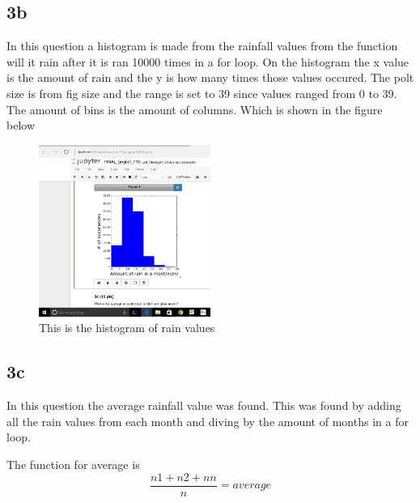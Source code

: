 \documentclass[twocolumn]{revtex4}
\begin{document}
\subsection{3b}
In this question a histogram is made from the rainfall values from the function will it rain after it is ran 10000 times in a for loop. On the histogram the x value is the amount of rain and the y is how many times those values occured.  The polt size is from fig size and the range is set to 39 since values ranged from 0 to 39.  The amount of bins is the amount of columns.  Which is shown in the figure below
\begin{figure}[h] 
\centering
\includegraphics [width=0.5\textwidth]{pic.jpg}{\hspace{0.5 in}}
\caption{ This is the histogram of rain values\label{Histogram}}
\end{figure}


\subsection {3c}
In this question the average rainfall value was found. This was found by adding all the rain values from each month and diving by the amount of months in a for loop. 

The function for average is  
$$\frac{n1+n2+nn}{n}=average$$


\end{document}
